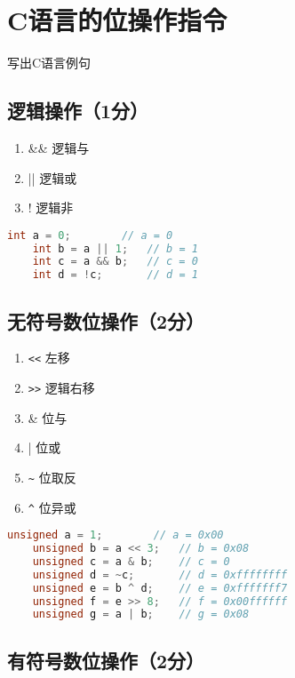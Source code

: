 \section{C语言的位操作指令}
\begin{center}
    写出C语言例句
\end{center}

\subsection{逻辑操作（1分）}

\begin{enumerate}
	\item \&\& 逻辑与
	\item ||   逻辑或
	\item !    逻辑非
\end{enumerate}

\begin{lstlisting}[language = c]
    int a = 0;        // a = 0
    int b = a || 1;   // b = 1
    int c = a && b;   // c = 0
    int d = !c;       // d = 1
\end{lstlisting}

\subsection{无符号数位操作（2分）}

\begin{enumerate}
	\item \lstinline|<<| 左移
    \item \lstinline|>>| 逻辑右移
	\item \& 位与
	\item | 位或
	\item \lstinline|~| 位取反
	\item \lstinline|^| 位异或
\end{enumerate}

\begin{lstlisting}[language = c]
    unsigned a = 1;        // a = 0x00
    unsigned b = a << 3;   // b = 0x08
    unsigned c = a & b;    // c = 0
    unsigned d = ~c;       // d = 0xffffffff
    unsigned e = b ^ d;    // e = 0xfffffff7
    unsigned f = e >> 8;   // f = 0x00ffffff
    unsigned g = a | b;    // g = 0x08
\end{lstlisting}

\subsection{有符号数位操作（2分）}

